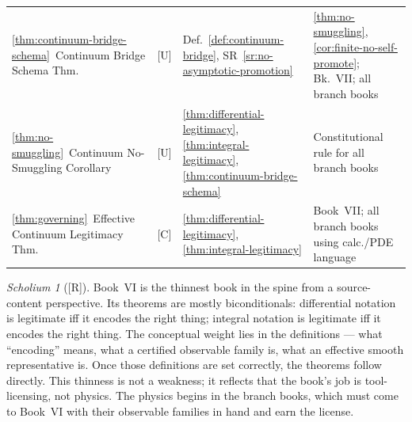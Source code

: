 \documentclass[12pt,oneside]{amsbook}
\theoremstyle{plain}
\theoremstyle{definition}
\theoremstyle{remark}
\newtheorem{scholium}[theorem]{Scholium}
\newcommand{\status}[1]{\textup{[#1]}}
\begin{document}
\begin{tabular}{@{}p{4.2cm}p{0.8cm}p{3.4cm}p{4.6cm}@{}}
\ref{thm:continuum-bridge-schema}\ Continuum Bridge Schema Thm.
  & [U] & Def.~\ref{def:continuum-bridge}, SR~\ref{sr:no-asymptotic-promotion}
  & \ref{thm:no-smuggling}, \ref{cor:finite-no-self-promote}; Bk.~VII;
    all branch books \\

\ref{thm:no-smuggling}\ Continuum No-Smuggling Corollary
  & [U] & \ref{thm:differential-legitimacy}, \ref{thm:integral-legitimacy},
    \ref{thm:continuum-bridge-schema}
  & Constitutional rule for all branch books \\

\ref{thm:governing}\ Effective Continuum Legitimacy Thm.
  & [C] & \ref{thm:differential-legitimacy}, \ref{thm:integral-legitimacy}
  & Book~VII; all branch books using calc./PDE language \\
\hline
\end{tabular}
\renewcommand{\arraystretch}{1}

\medskip

\begin{scholium}[\status{R}]\label{sch:book-vi-honest-posture}
Book~VI is the thinnest book in the spine from a source-content
perspective.  Its theorems are mostly biconditionals: differential
notation is legitimate iff it encodes the right thing; integral
notation is legitimate iff it encodes the right thing.  The conceptual
weight lies in the definitions --- what ``encoding'' means, what a
certified observable family is, what an effective smooth representative
is.  Once those definitions are set correctly, the theorems follow
directly.  This thinness is not a weakness; it reflects that the
book's job is tool-licensing, not physics.  The physics begins in the
branch books, which must come to Book~VI with their observable families
in hand and earn the license.
\end{scholium}
\end{document}
